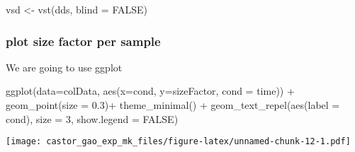 \documentclass[
]{article}
\newenvironment{Shaded}{\begin{snugshade}}{\end{snugshade}}
\newcommand{\AttributeTok}[1]{\textcolor[rgb]{0.77,0.63,0.00}{#1}}
\newcommand{\ConstantTok}[1]{\textcolor[rgb]{0.00,0.00,0.00}{#1}}
\newcommand{\DecValTok}[1]{\textcolor[rgb]{0.00,0.00,0.81}{#1}}
\newcommand{\FloatTok}[1]{\textcolor[rgb]{0.00,0.00,0.81}{#1}}
\newcommand{\FunctionTok}[1]{\textcolor[rgb]{0.00,0.00,0.00}{#1}}
\newcommand{\NormalTok}[1]{#1}
\newcommand{\OtherTok}[1]{\textcolor[rgb]{0.56,0.35,0.01}{#1}}
\newcommand{\SpecialCharTok}[1]{\textcolor[rgb]{0.00,0.00,0.00}{#1}}
\begin{document}
\begin{Shaded}
\begin{Highlighting}[]
\NormalTok{vsd }\OtherTok{\textless{}{-}} \FunctionTok{vst}\NormalTok{(dds, }\AttributeTok{blind =} \ConstantTok{FALSE}\NormalTok{)}
\end{Highlighting}
\end{Shaded}

\begin{Shaded}
\end{Shaded}

\hypertarget{plot-size-factor-per-sample}{%
\subsubsection{plot size factor per
sample}\label{plot-size-factor-per-sample}}

We are going to use ggplot

\begin{Shaded}
\begin{Highlighting}[]
\FunctionTok{ggplot}\NormalTok{(}\AttributeTok{data=}\NormalTok{colData, }\FunctionTok{aes}\NormalTok{(}\AttributeTok{x=}\NormalTok{cond, }\AttributeTok{y=}\NormalTok{sizeFactor, }\AttributeTok{cond =}\NormalTok{ time)) }\SpecialCharTok{+} \FunctionTok{geom\_point}\NormalTok{(}\AttributeTok{size =} \FloatTok{0.3}\NormalTok{)}\SpecialCharTok{+} \FunctionTok{theme\_minimal}\NormalTok{() }\SpecialCharTok{+}
  \FunctionTok{geom\_text\_repel}\NormalTok{(}\FunctionTok{aes}\NormalTok{(}\AttributeTok{label =}\NormalTok{ cond), }\AttributeTok{size =} \DecValTok{3}\NormalTok{, }\AttributeTok{show.legend =} \ConstantTok{FALSE}\NormalTok{)}
\end{Highlighting}
\end{Shaded}

\texttt{[image: castor\_gao\_exp\_mk\_files/figure-latex/unnamed-chunk-12-1.pdf]}
\end{document}
